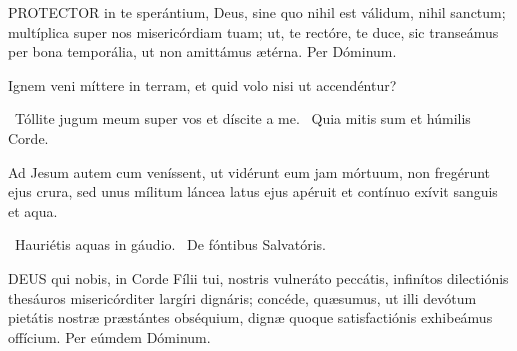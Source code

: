 
\lettrine[lines=2]{P}{ROTECTOR} in te sperántium, Deus, sine quo nihil est válidum, nihil sanctum; multíplica super nos misericórdiam tuam; ut, te rectóre, te duce, sic transeámus per bona temporália, ut non amittámus ætérna. Per Dóminum.


 Ignem veni míttere in terram, et quid volo nisi ut accendéntur?

\V\ Tóllite jugum meum super vos et díscite a me. \R\ Quia mitis sum et húmilis Corde.


 Ad Jesum autem cum veníssent, ut vidérunt eum jam mórtuum, non fregérunt ejus crura, sed unus mílitum láncea latus ejus apéruit et contínuo exívit sanguis et aqua.

\V\ Hauriétis aquas in gáudio. \R\ De fóntibus Salvatóris.


\lettrine[lines=2]{D}{EUS} qui nobis, in Corde Fílii tui, nostris vulneráto peccátis, infinítos dilectiónis thesáuros misericórditer largíri dignáris; concéde, quæsumus, ut illi devótum pietátis nostræ præstántes obséquium, dignæ quoque satisfactiónis exhibeámus offícium. Per eúmdem Dóminum.


